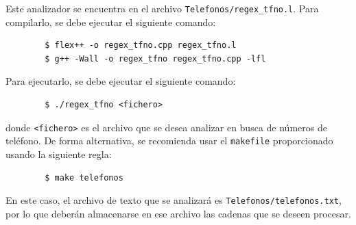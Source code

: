 \documentclass[12pt]{article}
\begin{document}
    Este analizador se encuentra en el archivo \verb|Telefonos/regex_tfno.l|. Para compilarlo, se debe ejecutar el siguiente comando:
    \begin{verbatim}
        $ flex++ -o regex_tfno.cpp regex_tfno.l
        $ g++ -Wall -o regex_tfno regex_tfno.cpp -lfl
    \end{verbatim}

    Para ejecutarlo, se debe ejecutar el siguiente comando:
    \begin{verbatim}
        $ ./regex_tfno <fichero>
    \end{verbatim}
    donde \verb|<fichero>| es el archivo que se desea analizar en busca de números de teléfono.
    De forma alternativa, se recomienda usar el \verb|makefile| proporcionado usando la siguiente regla:
    \begin{verbatim}
        $ make telefonos
    \end{verbatim}
    En este caso, el archivo de texto que se analizará es \verb|Telefonos/telefonos.txt|, por lo que deberán almacenarse en ese archivo las cadenas que se deseen procesar.\\
\end{document}
